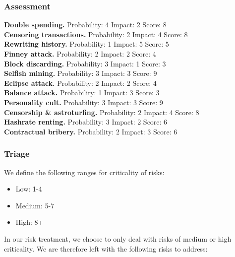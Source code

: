 \documentclass[12pt,a4paper]{article}
\begin{document}
\subsubsection{Assessment}

\textbf{Double spending.}
Probability: 4
Impact: 2
Score: 8\\

\textbf{Censoring transactions.}
Probability: 2
Impact: 4
Score: 8\\

\textbf{Rewriting history.}
Probability: 1
Impact: 5
Score: 5\\

\textbf{Finney attack.}
Probability: 2
Impact: 2
Score: 4\\

\textbf{Block discarding.}
Probability: 3
Impact: 1
Score: 3\\

\textbf{Selfish mining.}
Probability: 3
Impact: 3
Score: 9\\

\textbf{Eclipse attack.}
Probability: 2
Impact: 2
Score: 4\\

\textbf{Balance attack.}
Probability: 1
Impact: 3
Score: 3\\

\textbf{Personality cult.}
Probability: 3
Impact: 3
Score: 9\\

\textbf{Censorship \& astroturfing.}
Probability: 2
Impact: 4
Score: 8\\

\textbf{Hashrate renting.}
Probability: 3
Impact: 2
Score: 6\\

\textbf{Contractual bribery.}
Probability: 2
Impact: 3
Score: 6\\

\subsubsection{Triage}

We define the following ranges for criticality of risks:
\begin{itemize}
  \item Low: 1-4
  \item Medium: 5-7
  \item High: 8+
\end{itemize}

In our risk treatment, we choose to only deal with risks of medium or high criticality. We are therefore left with the following risks to address:\\
\end{document}
